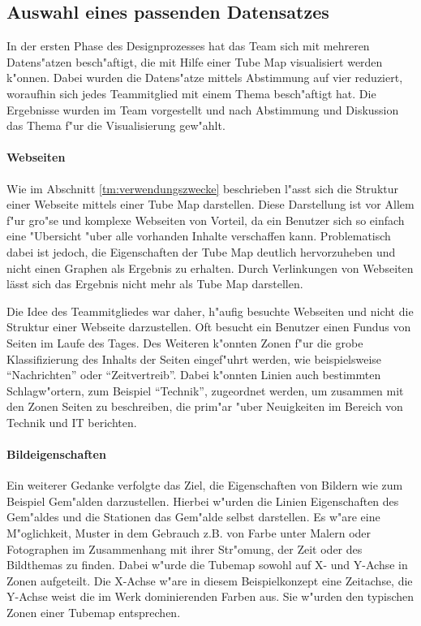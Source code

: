 
\subsection{Auswahl eines passenden Datensatzes}
In der ersten Phase des Designprozesses hat das Team sich mit mehreren Datens"atzen besch"aftigt, die mit Hilfe einer Tube Map visualisiert werden k"onnen. Dabei wurden die Datens"atze mittels Abstimmung auf vier reduziert, woraufhin sich jedes Teammitglied mit einem Thema besch"aftigt hat. Die Ergebnisse wurden im Team vorgestellt und nach Abstimmung und Diskussion das Thema f"ur die Visualisierung gew"ahlt.

\paragraph{Webseiten}
Wie im Abschnitt \ref{tm:verwendungszwecke} beschrieben l"asst sich die Struktur einer Webseite mittels einer Tube Map darstellen.  Diese Darstellung ist vor Allem f"ur gro"se und komplexe Webseiten von Vorteil, da ein Benutzer sich so einfach eine "Ubersicht "uber alle vorhanden Inhalte verschaffen kann. Problematisch dabei ist jedoch, die Eigenschaften der Tube Map deutlich hervorzuheben und nicht einen Graphen als Ergebnis zu erhalten. Durch Verlinkungen von Webseiten lässt sich das Ergebnis nicht mehr als Tube Map darstellen.

Die Idee des Teammitgliedes war daher, h"aufig besuchte Webseiten und nicht die Struktur einer Webseite darzustellen. Oft besucht ein Benutzer einen Fundus von Seiten im Laufe des Tages. Des Weiteren k"onnten Zonen f"ur die grobe Klassifizierung des Inhalts der Seiten eingef"uhrt werden, wie beispielsweise "`Nachrichten"' oder "`Zeitvertreib"'. Dabei k"onnten Linien auch bestimmten Schlagw"ortern, zum Beispiel "`Technik"', zugeordnet werden, um zusammen mit den Zonen Seiten zu beschreiben, die prim"ar "uber Neuigkeiten im Bereich von Technik und IT berichten. 

\paragraph{Bildeigenschaften}
\label{dp:bildeigenschaften}
Ein weiterer Gedanke verfolgte das Ziel, die Eigenschaften von Bildern wie zum Beispiel Gem"alden darzustellen. Hierbei w"urden die Linien Eigenschaften des Gem"aldes und die Stationen das Gem"alde selbst darstellen. Es w"are eine M"oglichkeit, Muster in dem Gebrauch z.B. von Farbe unter Malern oder Fotographen im Zusammenhang mit ihrer Str"omung, der Zeit oder des Bildthemas zu finden. Dabei w"urde die Tubemap sowohl auf X- und Y-Achse in Zonen aufgeteilt. Die X-Achse w"are in diesem Beispielkonzept eine Zeitachse, die Y-Achse weist die im Werk dominierenden Farben aus. Sie w"urden den typischen Zonen einer Tubemap entsprechen.


